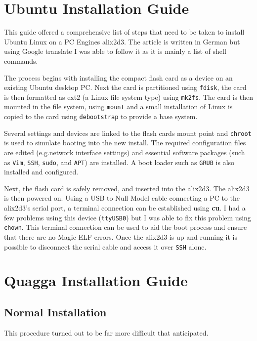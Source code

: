 \section*{Ubuntu Installation Guide}

 This guide\cite{germanGuide} offered a comprehensive list of steps that need to
 be taken to install Ubuntu Linux on a PC Engines alix2d3\cite{alix2d3}.  The article is
 written in German but using Google translate I was able to follow it as it is
 mainly a list of shell commands.

 The process begins with installing the compact flash card as a device on an
 existing Ubuntu desktop PC\@. Next the card is partitioned using \texttt{fdisk},
 the card is then formatted as ext2 (a Linux file system type) using
 \texttt{mk2fs}. The card is then mounted in the file system, using
 \texttt{mount} and a small installation of Linux is copied to the card using
 \texttt{debootstrap} to provide a base system.

 Several settings and devices are linked to the flash cards mount point and
 \texttt{chroot} is used to simulate booting into the new install. The required
 configuration files are edited (e.g.\@ network interface settings) and essential
 software packages (such as \texttt{Vim}, \texttt{SSH}, \texttt{sudo}, and
 \texttt{APT}) are installed. A boot loader such as \texttt{GRUB} is also
 installed and configured.

 Next, the flash card is safely removed, and  inserted into the alix2d3. The
 alix2d3 is then powered on. Using a USB to Null Model cable connecting a PC to
 the alix2d3's serial port, a terminal connection can be established using {\bf
 cu}. I had a few problems using this device (\texttt{ttyUSB0}) but I was able to
 fix this problem using \texttt{chown}. This terminal connection can be used to
 aid the boot process and ensure that there are no Magic ELF errors. Once the
 alix2d3 is up and running it is possible to disconnect the serial cable and
 access it over \texttt{SSH} alone.

 \section*{Quagga Installation Guide}

 \subsection*{Normal Installation}
This procedure turned out to be far more difficult that anticipated.

